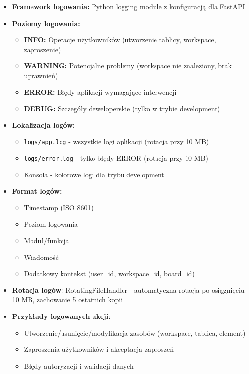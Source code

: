 \documentclass[12pt,a4paper]{article}
\begin{document}
\begin{itemize}[leftmargin=*]
    \item \textbf{Framework logowania:} Python logging module z konfiguracją dla FastAPI
    \item \textbf{Poziomy logowania:}
    \begin{itemize}
        \item \textbf{INFO:} Operacje użytkowników (utworzenie tablicy, workspace, zaproszenie)
        \item \textbf{WARNING:} Potencjalne problemy (workspace nie znaleziony, brak uprawnień)
        \item \textbf{ERROR:} Błędy aplikacji wymagające interwencji
        \item \textbf{DEBUG:} Szczegóły deweloperskie (tylko w trybie development)
    \end{itemize}
    \item \textbf{Lokalizacja logów:}
    \begin{itemize}
        \item \texttt{logs/app.log} - wszystkie logi aplikacji (rotacja przy 10 MB)
        \item \texttt{logs/error.log} - tylko błędy ERROR (rotacja przy 10 MB)
        \item Konsola - kolorowe logi dla trybu development
    \end{itemize}
    \item \textbf{Format logów:}
    \begin{itemize}
        \item Timestamp (ISO 8601)
        \item Poziom logowania
        \item Moduł/funkcja
        \item Wiadomość
        \item Dodatkowy kontekst (user\_id, workspace\_id, board\_id)
    \end{itemize}
    \item \textbf{Rotacja logów:} RotatingFileHandler - automatyczna rotacja po osiągnięciu 10 MB, zachowanie 5 ostatnich kopii
    \item \textbf{Przykłady logowanych akcji:}
    \begin{itemize}
        \item Utworzenie/usunięcie/modyfikacja zasobów (workspace, tablica, element)
        \item Zaproszenia użytkowników i akceptacja zaproszeń
        \item Błędy autoryzacji i walidacji danych
    \end{itemize}
\end{itemize}
\end{document}
